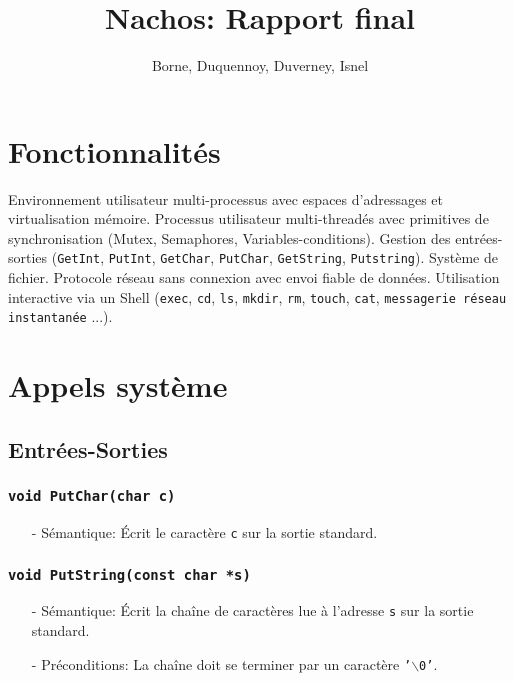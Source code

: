 \documentclass[11pt]{article}
\author{Borne, Duquennoy, Duverney, Isnel}
\date{}
\title{Nachos: Rapport final}
\theoremstyle{definition}
\theoremstyle{definition}
\begin{document}
\maketitle



\section{Fonctionnalités}
Environnement utilisateur multi-processus avec espaces d'adressages et virtualisation mémoire.
Processus utilisateur multi-threadés avec primitives de synchronisation (Mutex, Semaphores, Variables-conditions). Gestion des entrées-sorties (\texttt{GetInt}, \texttt{PutInt}, \texttt{GetChar}, \texttt{PutChar}, \texttt{GetString}, \texttt{Putstring}).
Système de fichier. Protocole réseau sans connexion avec envoi fiable de données.
Utilisation interactive via un Shell (\texttt{exec}, \texttt{cd}, \texttt{ls}, \texttt{mkdir}, \texttt{rm},
\texttt{touch}, \texttt{cat}, \texttt{messagerie réseau instantanée} ...).


\section{Appels système}
\subsection{Entrées-Sorties}

\subsubsection{\texttt{void PutChar(char c)}}
\begin{itemize}
\item[-] Sémantique: Écrit le caractère \texttt{c} sur la sortie standard.
\end{itemize}

\subsubsection{\texttt{void PutString(const char *s)}}
\begin{itemize}
\item[-] Sémantique: Écrit la chaîne de caractères lue à l'adresse \texttt{s} sur la sortie standard.
\item[-] Préconditions: La chaîne doit se terminer par un caractère \texttt{'$\backslash$0'}.
\end{itemize}
\end{document}
